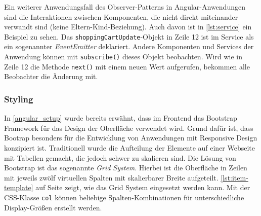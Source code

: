 Ein weiterer Anwendungsfall des Observer-Patterns in Angular-Anwendungen sind die Interaktionen zwischen Komponenten, die nicht direkt miteinander verwandt sind (keine Eltern-Kind-Beziehung). Auch davon ist in \cref{lst:service} ein Beispiel zu sehen. Das \texttt{shoppingCartUpdate}-Objekt in Zeile 12 ist im Service als ein sogenannter \textit{EventEmitter} deklariert. Andere Komponenten und Services der Anwendung können mit \texttt{subscribe()} dieses Objekt beobachten. Wird wie in Zeile 12 die Methode \texttt{next()} mit einem neuen Wert aufgerufen, bekommen alle Beobachter die Änderung mit.

\subsubsection{Styling}

In \cref{angular_setup} wurde bereits erwähnt, dass im Frontend das Bootstrap Framework für das Design der Oberfläche verwendet wird. Grund dafür ist, dass Bootrap besonders für die Entwicklung von Anwendungen mit Responsive Design konzipiert ist. Traditionell wurde die Aufteilung der Elemente auf einer Webseite mit Tabellen gemacht, die jedoch schwer zu skalieren sind. Die Lösung von Bootstrap ist das sogenannte \textit{Grid System}. Hierbei ist die Oberfläche in Zeilen mit jeweils zwölf virtuellen Spalten mit skalierbarer Breite aufgeteilt. \cref{lst:item-template} auf Seite \pageref{lst:item-template} zeigt, wie das Grid System eingesetzt werden kann. Mit der CSS-Klasse \texttt{col} können beliebige Spalten-Kombinationen für unterschiedliche Display-Größen erstellt werden.
